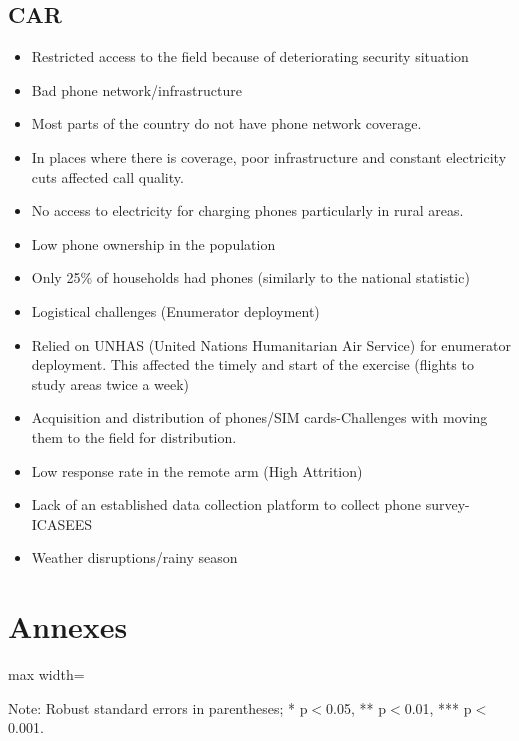 \documentclass[11pt,harvard]{article}
\begin{document}
\subsection{CAR}

\begin{itemize}[label=--, left=1.5em]
	\item[1.] Restricted access to the field because of deteriorating security situation
	\item[2.] Bad phone network/infrastructure 
		\item[a.]	Most parts of the country do not have phone network coverage.
		\item[b.]	In places where there is coverage, poor infrastructure and constant electricity cuts affected call quality.
		\item[c.]	No access to electricity for charging phones particularly in rural areas.
	\item[3.] Low phone ownership in the population
		\item[a.] Only 25\% of households had phones (similarly to the national statistic)
	\item[4.] Logistical challenges (Enumerator deployment)
		\item[a.]	Relied on UNHAS (United Nations Humanitarian Air Service) for enumerator deployment. This affected the timely and start of the exercise (flights to study areas twice a week)
		\item[b.]	Acquisition and distribution of phones/SIM cards-Challenges with moving them to the field for distribution.
	\item[5.] Low response rate in the remote arm (High Attrition)
	\item[6.] Lack of an established data collection platform to collect phone survey-ICASEES 
	\item[7.] Weather disruptions/rainy season
\end{itemize}


\pagebreak


\section{Annexes}

\begin{table}[htbp]
	\centering
	\begin{adjustbox}{max width=\textwidth}
		\begin{threeparttable}
			\caption{Myanmar Sample Balance Table}
			\scriptsize
			 
			\label{tab:Myanmar_Modality_Demo_Balance}
			\begin{tablenotes}
				\item Note: Robust standard errors in parentheses; * p$<$0.05, ** p$<$0.01, *** p$<$0.001. 
			\end{tablenotes}
		\end{threeparttable}
	\end{adjustbox}
\end{table}
\end{document}

